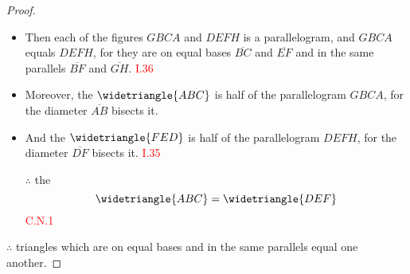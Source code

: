 \begin{proof}

\begin{itemize}

\item Then each of the figures $GBCA$ and $DEFH$ is a parallelogram, and $GBCA$ equals $DEFH$, for they are on equal bases $\overline{BC}$ and $\overline{EF}$ and in the same parallels $\overline{BF}$ and $\overline{GH}$. \hfill\textcolor{red}{I.36}

\item Moreover, the $\widetriangle{ABC}$ is half of the parallelogram $GBCA$, for the diameter $\overline{AB}$ bisects it. 

\item And the $\widetriangle{FED}$ is half of the parallelogram $DEFH$, for the diameter $\overline{DF}$ bisects it. \hfill\textcolor{red}{I.35}

\item[$\therefore$] the 
\[\widetriangle{ABC} = \widetriangle{DEF}\]\hfill\textcolor{red}{C.N.1}

\end{itemize}

$\therefore$ triangles which are on equal bases and in the same parallels equal one another.

\end{proof}

\clearpage
